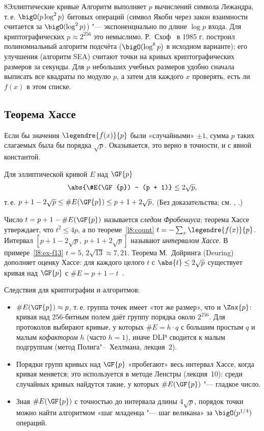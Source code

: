 \begin{lecture}{8}{Эллиптические кривые}
Алгоритм выполняет $p$ вычислений символа Лежандра, т.\,е. $\bigO(p \log^2 p)$ битовых операций
(символ Якоби через закон взаимности считается за $\bigO(\log^2 p)$) "--- экспоненциально
по длине $\log p$ входа. Для криптографических $p \approx 2^{256}$ это немыслимо.
Р.~Схоф~\cite{schoof} в 1985 г. построил полиномиальный алгоритм подсчёта
($\bigO(\log^8 p)$ в исходном варианте); его улучшения (алгоритм SEA) считают точки на кривых
криптографических размеров за секунды. Для $p$ небольших учебных размеров удобно сначала выписать
все квадраты по модулю $p$, а затем для каждого $x$ проверять, есть ли $f(x)$ в этом списке.


\subsection{Теорема Хассе}

Если бы значения $\legendre{f(x)}{p}$ были «случайными» $\pm 1$, сумма $p$ таких слагаемых
была бы порядка $\sqrt p$. Оказывается, это верно в точности, и с явной константой.

\begin{theorem}[Хассе]\label{l8:hasse}
Для эллиптической кривой $E$ над $\GF{p}$
\[
  \abs{\#E(\GF{p}) - (p + 1)} \le 2\sqrt p,
\]
т.\,е. $p + 1 - 2\sqrt p \le \#E(\GF{p}) \le p + 1 + 2\sqrt p$. (Без доказательства; см.
\cite[разд.~4.2]{washington}, \cite[гл.~V, \S\,1]{silverman-aec}.)
\end{theorem}

Число $t = p + 1 - \#E(\GF{p})$ называется \emph{следом Фробениуса}; теорема Хассе утверждает,
что $t^2 \le 4p$, а по теореме~\ref{l8:count} $t = -\sum_x \legendre{f(x)}{p}$. Интервал
$[p + 1 - 2\sqrt p,\ p + 1 + 2\sqrt p]$ называют \emph{интервалом Хассе}. В примере~\ref{l8:ex-f13}
$t = 5$, $2\sqrt{13} \approx 7{,}21$. Теорема М.~Дойринга (Deuring) дополняет оценку Хассе:
для каждого целого $t$ с $\abs{t} \le 2\sqrt p$ существует кривая над $\GF{p}$ с
$\#E = p + 1 - t$~\cite[разд.~7.3]{crandall-pomerance}.

Следствия для криптографии и алгоритмов:
\begin{itemize}
  \item $\#E(\GF{p}) \approx p$, т.\,е. группа точек имеет «тот же размер», что и $\Znx{p}$:
    кривая над $256$-битным полем даёт группу порядка около $2^{256}$. Для протоколов выбирают
    кривые, у которых $\#E = h \cdot q$ с большим простым $q$ и малым \emph{кофактором} $h$
    (часто $h = 1$), иначе DLP сводится к малым подгруппам (метод Полига"--~Хеллмана, лекция~2).
  \item Порядки групп кривых над $\GF{p}$ «пробегают» весь интервал Хассе, когда кривая меняется;
    это используется в методе Ленстры (лекция~10): среди случайных кривых найдутся такие, у
    которых $\#E(\GF{p})$ "--- гладкое число.
  \item Зная $\#E(\GF{p})$ с точностью до интервала длины $4\sqrt p$, порядок точки можно найти
    алгоритмом «шаг младенца "--- шаг великана» за $\bigO(p^{1/4})$ операций.
\end{itemize}


\end{lecture}
